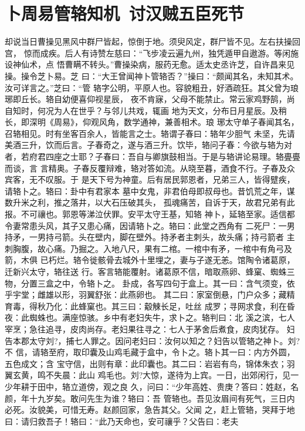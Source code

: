 \chapter{卜周易管辂知机~讨汉贼五臣死节}

却说当日曹操见黑风中群尸皆起，惊倒于地。须臾风定，群尸皆不见。左右扶操回宫，
惊而成疾。后人有诗赞左慈曰：“飞步凌云遍九州，独凭遁甲自遨游。等闲施设神仙术，点
悟曹瞒不转头。”曹操染病，服药无愈。适太史丞许芝，自许昌来见操。操令芝卜易。芝
曰：“大王曾闻神卜管辂否？”操曰：“颇闻其名，未知其术。汝可详言之。”芝曰：“管
辂字公明，平原人也。容貌粗丑，好酒疏狂。其父曾为琅琊即丘长。辂自幼便喜仰视星辰，
夜不肯寐，父母不能禁止。常云家鸡野鹄，尚自知时，何况为人在世乎？与邻儿共戏，辄画
地为天文，分布日月星辰。及稍长，即深明《周易》，仰观风角，数学通神，兼善相术。琅
琊太守单子春闻其名，召辂相见。时有坐客百余人，皆能言之士。辂谓子春曰：辂年少胆气
未坚，先请美酒三升，饮而后言。子春奇之，遂与酒三升。饮毕，辂问子春：今欲与辂为对
者，若府君四座之士耶？子春曰：吾自与卿旗鼓相当。于是与辂讲论易理。辂亹亹而谈，言
言精奥。子春反覆辩难，辂对答如流。从晓至暮，酒食不行。子春及众宾客，无不叹服。于
是天下号为神童。后有居民郭恩者，兄弟三人，皆得躄疾，请辂卜之。辂曰：卦中有君家本
墓中女鬼，非君伯母即叔母也。昔饥荒之年，谋数升米之利，推之落井，以大石压破其头，
孤魂痛苦，自诉于天，故君兄弟有此报。不可禳也。郭恩等涕泣伏罪。安平太守王基，知辂
神卜，延辂至家。适信都令妻常患头风，其子又患心痛，因请辂卜之。辂曰：此堂之西角有
二死尸：一男持矛，一男持弓箭。头在壁内，脚在壁外。持矛者主刺头，故头痛；持弓箭者
主刺胸腹，故心痛。乃掘之。入地八尺，果有二棺。一棺中有矛，一棺中有角弓及箭，木俱
已朽烂。辂令徙骸骨去城外十里埋之，妻与子遂无恙。馆陶令诸葛原，迁新兴太守，辂往送
行。客言辂能覆射。诸葛原不信，暗取燕卵、蜂窠、蜘蛛三物，分置三盒之中，令辂卜之。
卦成，各写四句于盒上。其一曰：含气须变，依乎宇堂；雌雄以形，羽翼舒张：此燕卵也。
其二曰：家室倒悬，门户众多；藏精育毒，得秋乃化：此蜂窠也。其三曰：觳觫长足，吐丝
成罗；寻网求食，利在昏夜：此蜘蛛也。满座惊骇。乡中有老妇失牛，求卜之。辂判曰：北
溪之滨，七人宰烹；急往追寻，皮肉尚存。老妇果往寻之：七人于茅舍后煮食，皮肉犹存。
妇告本郡太守刘?，捕七人罪之。因问老妇曰：汝何以知之？妇告以管辂之神卜。刘?不
信，请辂至府，取印囊及山鸡毛藏于盒中，令卜之。辂卜其一曰：内方外圆，五色成文；含
宝守信，出则有章：此印囊也。其二曰：岩岩有鸟，锦体朱衣；羽翼玄黄，鸣不失晨：此山
鸡毛也。刘?大惊，遂待为上宾。一日，出郊闲行，见一少年耕于田中，辂立道傍，观之良
久，问曰：“少年高姓、贵庚？答曰：姓赵，名颜，年十九岁矣。敢问先生为谁？辂曰：吾
管辂也。吾见汝眉间有死气，三日内必死。汝貌美，可惜无寿。赵颜回家，急告其父。父闻
之，赶上管辂，哭拜于地曰：请归救吾子！辂曰：“此乃天命也，安可禳乎？父告曰：老夫
